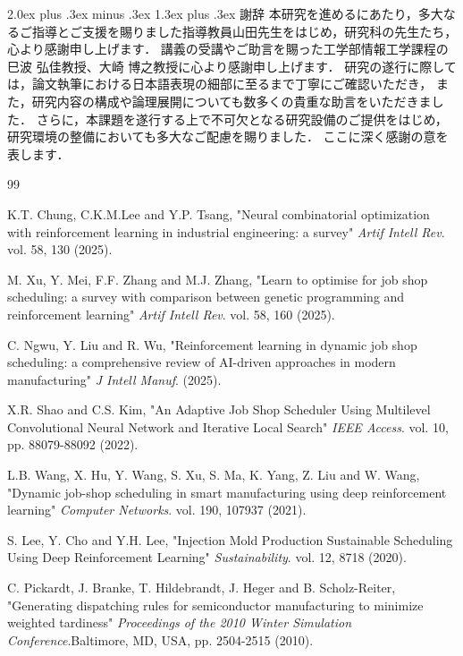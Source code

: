 \documentclass{jarticle}
\makeatletter
\renewcommand{\section}{%
  \@startsection{section}{1}{\z@}%
  {2.0ex plus .3ex minus .3ex}%
  {1.3ex plus .3ex}%
  {\huge\bfseries}%
}
\makeatother
\begin{document}
\section{謝辞}
本研究を進めるにあたり，多大なるご指導とご支援を賜りました指導教員山田先生をはじめ，研究科の先生たち，心より感謝申し上げます．
講義の受講やご助言を賜った工学部情報工学課程の巳波 弘佳教授、大崎 博之教授に心より感謝申し上げます．
研究の遂行に際しては，論文執筆における日本語表現の細部に至るまで丁寧にご確認いただき，
また，研究内容の構成や論理展開についても数多くの貴重な助言をいただきました．
さらに，本課題を遂行する上で不可欠となる研究設備のご提供をはじめ，
研究環境の整備においても多大なご配慮を賜りました．
ここに深く感謝の意を表します．
\clearpage

\begin{thebibliography}{99}

 K.T. Chung, C.K.M.Lee and Y.P. Tsang, "Neural combinatorial optimization with reinforcement learning in industrial engineering: a survey"
\textit{Artif Intell Rev}. vol. 58, 130 (2025).

 M. Xu, Y. Mei, F.F. Zhang and M.J. Zhang, "Learn to optimise for job shop scheduling: a survey with comparison between genetic programming and reinforcement learning"
\textit{Artif Intell Rev}. vol. 58, 160 (2025).

 C. Ngwu, Y. Liu and R. Wu, "Reinforcement learning in dynamic job shop scheduling: a comprehensive review of AI-driven approaches in modern manufacturing"
\textit{J Intell Manuf}. (2025).

 X.R. Shao and C.S. Kim, "An Adaptive Job Shop Scheduler Using Multilevel Convolutional Neural Network and Iterative Local Search"
\textit{IEEE Access}. vol. 10, pp. 88079-88092 (2022).

 L.B. Wang, X. Hu, Y. Wang, S. Xu, S. Ma, K. Yang, Z. Liu and W. Wang, "Dynamic job-shop scheduling in smart manufacturing using deep reinforcement learning"
\textit{Computer Networks}. vol. 190, 107937 (2021).

 S. Lee, Y. Cho and Y.H. Lee, "Injection Mold Production Sustainable Scheduling Using Deep Reinforcement Learning"
\textit{Sustainability}. vol. 12, 8718 (2020).

 C. Pickardt, J. Branke, T. Hildebrandt, J. Heger and B. Scholz-Reiter, "Generating dispatching rules for semiconductor manufacturing to minimize weighted tardiness"
\textit{Proceedings of the 2010 Winter Simulation Conference}.Baltimore, MD, USA, pp. 2504-2515 (2010).


\end{thebibliography}
\end{document}
